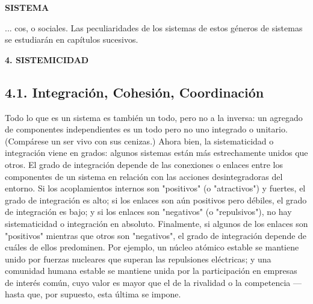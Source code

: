 \newpage
\fancyhf{}
\fancyhead[r]{\thepage}
\begin{center}
{\fontsize{13}{16}\selectfont \textbf{SISTEMA}}
\end{center}
\vspace{0.5cm}

{\fontsize{13}{15}\selectfont
... cos, o sociales. Las peculiaridades de los sistemas de estos géneros de sistemas se estudiarán en capítulos sucesivos.

\vspace{0.5cm}
\begin{center}
{\fontsize{13}{16}\selectfont \textbf{4. SISTEMICIDAD}}
\end{center}
\vspace{0.5cm}

\subsection*{4.1. Integración, Cohesión, Coordinación}

Todo lo que es un sistema es también un todo, pero no a la inversa: un agregado de componentes independientes es un todo pero no uno integrado o unitario. (Compárese un ser vivo con sus cenizas.) Ahora bien, la sistematicidad o integración viene en grados: algunos sistemas están más estrechamente unidos que otros. El grado de integración depende de las conexiones o enlaces entre los componentes de un sistema en relación con las acciones desintegradoras del entorno. Si los acoplamientos internos son "positivos" (o "atractivos") y fuertes, el grado de integración es alto; si los enlaces son aún positivos pero débiles, el grado de integración es bajo; y si los enlaces son "negativos" (o "repulsivos"), no hay sistematicidad o integración en absoluto. Finalmente, si algunos de los enlaces son "positivos" mientras que otros son "negativos", el grado de integración depende de cuáles de ellos predominen. Por ejemplo, un núcleo atómico estable se mantiene unido por fuerzas nucleares que superan las repulsiones eléctricas; y una comunidad humana estable se mantiene unida por la participación en empresas de interés común, cuyo valor es mayor que el de la rivalidad o la competencia —hasta que, por supuesto, esta última se impone.

}
